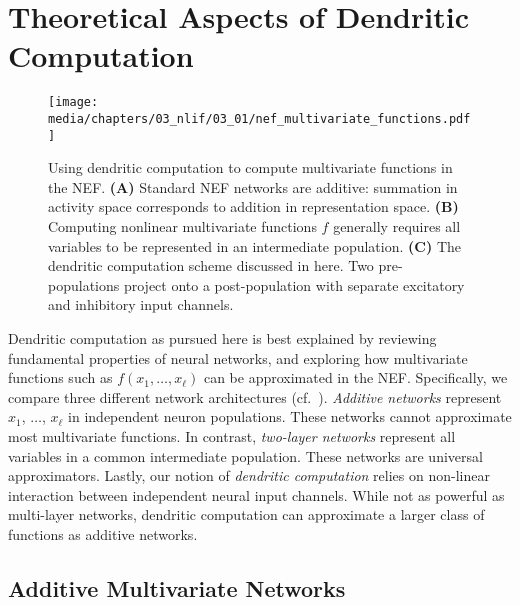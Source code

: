 
\section{Theoretical Aspects of Dendritic Computation}
\label{sec:dendritic_computation_theory}

\begin{figure}
	\centering
	\texttt{[image: media/chapters/03\_nlif/03\_01/nef\_multivariate\_functions.pdf]}%
	{\label{fig:nef_multivariate_functions_a}}%
	{\label{fig:nef_multivariate_functions_b}}%
	{\label{fig:nef_multivariate_functions_c}}%
	\caption[Using dendritic computation to compute multivariate functions in the NEF]{Using dendritic computation to compute multivariate functions in the NEF. \textbf{(A)} Standard NEF networks are additive: summation in activity space corresponds to addition in representation space.
	\textbf{(B)} Computing nonlinear multivariate functions $f$ generally requires all variables to be represented in an intermediate population.
	\textbf{(C)} The dendritic computation scheme discussed in here.
	Two pre-populations project onto a post-population with separate excitatory and inhibitory input channels.
	}
	\label{fig:nef_multivariate_functions}
\end{figure}

Dendritic computation as pursued here is best explained by reviewing fundamental properties of neural networks, and exploring how mul\-ti\-va\-ri\-ate functions such as $f(x_1, \ldots, x_\ell)$ can be approximated in the NEF.
Specifically, we compare three different network architectures (cf.~).
\emph{Additive networks} represent $x_1$, $\ldots$, $x_\ell$ in independent neuron populations.
These networks cannot approximate most multivariate functions.
In contrast, \emph{two-layer networks} represent all variables in a common intermediate population.
These networks are universal approximators.
Lastly, our notion of \emph{dendritic computation} relies on non-linear interaction between independent neural input channels.
While not as powerful as multi-layer networks, dendritic computation can approximate a larger class of functions as additive networks.

\subsection{Additive Multivariate Networks}
\label{sec:additive_net}

